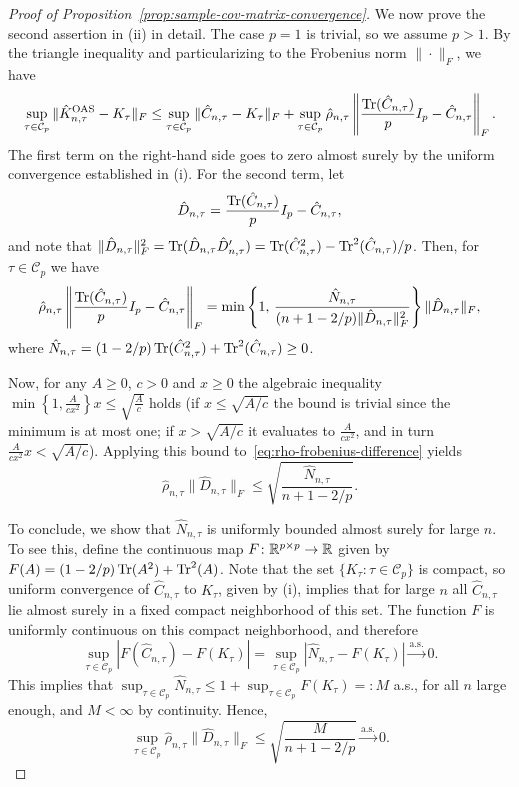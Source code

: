 \begin{proof}[Proof of Proposition~\ref{prop:sample-cov-matrix-convergence}]
  We now prove the second assertion in (ii) in detail. The case \(p=1\) is trivial, so we assume \(p>1\). By the triangle inequality and particularizing to the Frobenius norm \(\|\cdot\|_F\), we have
  \[
  \sup_{\tau\in \mathcal C_p}\|\hat K^{\text{OAS}}_{n,\tau} - K_\tau\|_F \leq \sup_{\tau\in \mathcal C_p}\|\hat C_{n,\tau} - K_\tau\|_F + \sup_{\tau\in \mathcal C_p}\hat\rho_{n,\tau}\left\|\frac{\operatorname{Tr}(\hat C_{n,\tau})}{p}I_p - \hat C_{n,\tau}\right\|_F.
  \]
  The first term on the right-hand side goes to zero almost surely by the uniform convergence established in (i). For the second term, let
  \[
  \hat{D}_{n,\tau} = \frac{\operatorname{Tr}(\hat C_{n,\tau})}{p}I_p - \hat C_{n,\tau},
  \]
  and note that \(\|\hat{D}_{n,\tau}\|_F^2 = \operatorname{Tr}(\hat D_{n,\tau}\hat D_{n,\tau}') = \operatorname{Tr}(\hat C_{n,\tau}^2) - \operatorname{Tr}^2(\hat C_{n,\tau})/p\). Then, for \(\tau\in \mathcal C_p\) we have
  \begin{equation}\label{eq:rho-frobenius-difference}
  \hat\rho_{n,\tau}\left\|\frac{\operatorname{Tr}(\hat C_{n,\tau})}{p}I_p - \hat C_{n,\tau}\right\|_F = \min\left\{1,\, \frac{\hat{N}_{n,\tau}}{(n + 1 - 2/p)\|\hat{D}_{n,\tau}\|_F^2}\right\}\|\hat{D}_{n,\tau}\|_F,
  \end{equation}
  where \(\hat{N}_{n,\tau} = (1-2/p) \operatorname{Tr}(\hat C_{n,\tau}^2) + \operatorname{Tr}^2(\hat C_{n,\tau}) \geq 0\). 

  Now, for any \(A\geq 0\), \(c>0\) and \(x\geq 0\) the algebraic inequality \(\min\left\{1,\frac{A}{cx^2}\right\}x \leq \sqrt{\frac{A}{c}}\) holds (if \(x \leq \sqrt{A/c}\) the bound is trivial since the minimum is at most one; if \(x > \sqrt{A/c}\) it evaluates to \(\frac{A}{cx^2}\), and in turn \(\frac{A}{cx^2}x < \sqrt{A/c}\)). Applying this bound to~\eqref{eq:rho-frobenius-difference} yields
  \[
  \hat\rho_{n,\tau}\|\hat D_{n,\tau}\|_F \leq \sqrt{\frac{\hat{N}_{n,\tau}}{n + 1 - 2/p}}.
  \]

  To conclude, we show that \(\hat N_{n,\tau}\) is uniformly bounded almost surely for large \(n\). To see this, define the continuous map \(F\colon\mathbb{R}^{p\times p} \to \mathbb{R}\) given by \(F(A)= (1-2/p)\operatorname{Tr}(A^2)+\operatorname{Tr}^2(A)\). Note that the set \(\{K_\tau: \tau \in \mathcal C_p\}\) is compact, so uniform convergence of \(\hat C_{n,\tau}\) to \(K_\tau\), given by (i), implies that for large \(n\) all \(\hat C_{n,\tau}\) lie almost surely in a fixed compact neighborhood of this set. The function \(F\) is uniformly continuous on this compact neighborhood, and therefore 
  \[
  \sup_{\tau\in \mathcal C_p}|F(\hat C_{n,\tau}) - F(K_\tau)| = \sup_{\tau\in \mathcal C_p}|\hat N_{n,\tau} - F(K_\tau)| \stackrel{\text{a.s.}}{\longrightarrow} 0.
  \] 
  This implies that \(\sup_{\tau\in \mathcal C_p}\hat N_{n,\tau}\leq 1 + \sup_{\tau\in \mathcal C_p} F(K_\tau) =: M\) a.s., for all \(n\) large enough, and \(M<\infty\) by continuity. Hence,
  \[
  \sup_{\tau \in \mathcal C_p} \hat\rho_{n,\tau}\|\hat D_{n,\tau}\|_F \leq \sqrt{\frac{M}{n + 1 - 2/p}} \stackrel{\text{a.s.}}{\longrightarrow} 0.
  \]
\end{proof}

